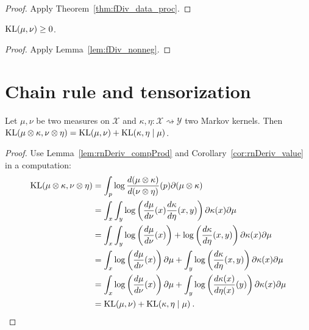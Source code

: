 \begin{proof}
Apply Theorem~\ref{thm:fDiv_data_proc}.
\end{proof}

\begin{lemma}
  \label{lem:kl_nonneg}
  $\mathrm{KL}(\mu, \nu) \ge 0$.
\end{lemma}

\begin{proof}
Apply Lemma~\ref{lem:fDiv_nonneg}.
\end{proof}

\section{Chain rule and tensorization}

\begin{theorem}
  \label{thm:kl_chain_rule}
  Let $\mu, \nu$ be two measures on $\mathcal X$ and $\kappa, \eta : \mathcal X \rightsquigarrow \mathcal Y$ two Markov kernels.
  Then $\mathrm{KL}(\mu \otimes \kappa, \nu \otimes \eta) = \mathrm{KL}(\mu, \nu) + \mathrm{KL}(\kappa, \eta \mid \mu)$.
\end{theorem}

\begin{proof}
Use Lemma~\ref{lem:rnDeriv_compProd} and Corollary~\ref{cor:rnDeriv_value} in a computation:
\begin{align*}
\mathrm{KL}(\mu \otimes \kappa, \nu \otimes \eta)
&= \int_p \log \frac{d(\mu \otimes \kappa)}{d(\nu \otimes \eta)}(p) \partial (\mu \otimes \kappa)
\\
&= \int_x \int_y\log \left(\frac{d\mu}{d \nu}(x)\frac{d\kappa}{d \eta}(x,y)\right) \partial \kappa(x) \partial\mu
\\
&= \int_x \int_y\log \left(\frac{d\mu}{d \nu}(x)\right) + \log \left(\frac{d\kappa}{d \eta}(x,y)\right) \partial \kappa(x) \partial\mu
\\
&= \int_x \log \left(\frac{d\mu}{d \nu}(x)\right)\partial\mu + \int_y\log \left(\frac{d\kappa}{d \eta}(x,y)\right) \partial \kappa(x) \partial\mu
\\
&= \int_x \log \left(\frac{d\mu}{d \nu}(x)\right)\partial\mu + \int_y\log \left(\frac{d\kappa(x)}{d \eta(x)}(y)\right) \partial \kappa(x) \partial\mu
\\
&= \mathrm{KL}(\mu, \nu) + \mathrm{KL}(\kappa, \eta \mid \mu)
\: .
\end{align*}

\end{proof}

